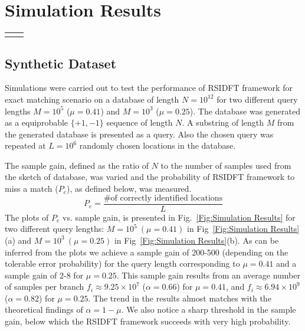 \section{Simulation Results} \label{sec:Simulation_Results}


\begin{figure*}[ht]
		\begin{tabular}{cc}
			\subfloat[$M=10^5(\mu=0.41), \tilde{N}=10^7, ~G=10^{5}$]{}&
			\subfloat[$M=10^3(\mu=0.25),~ \tilde{N}=10^6, ~G=10^{6}$]{}
		\end{tabular}
		
		\caption{Plots of probability of missing a match vs. sample gain for exact matching of a query of length $M$ from a equiprobable  binary \{+1,-1\} sequence of length $N= 10^{12}$, divided into $G$ blocks each of length $\tilde{N}$. The substring was simulated to repeat in $L=10^6$($\lambda=0.5$) locations uniformly at random.} \label{Fig:Simulation Results}
\end{figure*}

\subsection{Synthetic Dataset}
Simulations were carried out to test the performance of RSIDFT framework for exact matching scenario on a database of length $N=10^{12}$ for two different query lengths $M=10^5$ ($\mu = 0.41$) and $M=10^3$ ($\mu = 0.25$). The database was generated as a equiprobable $\{+1,-1\}$ sequence of length $N$. A substring of length $M$ from the generated database is presented as a query. Also the chosen query was repeated at $L=10^6$ randomly chosen locations in the database.

The sample gain, defined as the ratio of $N$ to the number of samples used from the sketch of database, was varied and the probability of RSIDFT framework to miss a match ($P_e$), as defined below, was measured.
\[P_e = \frac{\text{\# of correctly identified locations}}{L} \]   
The plots of $P_e$ vs. sample gain, is presented in Fig.~\ref{Fig:Simulation Results} for two different query lengths: $M=10^5~(\mu=0.41)$ in Fig~\ref{Fig:Simulation Results}(a) and $M=10^3~(\mu=0.25)$ in Fig~\ref{Fig:Simulation Results}(b). As can be inferred from the plots we achieve a sample gain of 200-500 (depending on the tolerable error probability) for the query length corresponding to  $\mu=0.41$ and a sample gain of $2$-$8$ for $\mu=0.25$. This sample gain results from an average number of samples per branch $f_i \approx 9.25 \times10^7 $ ($\alpha=0.66$) for $\mu=0.41$, and  $f_i \approx 6.94\times10^9 $ ($\alpha=0.82$) for $\mu=0.25$. The trend in the results almost matches with the theoretical findings of $\alpha = 1-\mu$. We also notice a sharp threshold in the sample gain, below which the RSIDFT framework succeeds with very high probability. 

